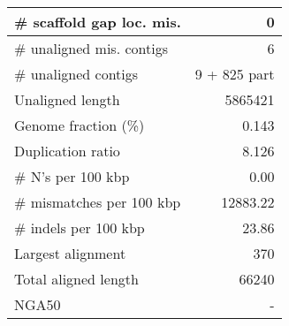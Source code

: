 \documentclass[12pt,a4paper]{article}
\begin{document}
\begin{table}[ht]
\begin{center}
\begin{tabular}{|l*{1}{|r}|}
\# scaffold gap loc. mis. & 0 \\ \hline
\# unaligned mis. contigs & 6 \\ \hline
\# unaligned contigs & 9 + 825 part \\ \hline
Unaligned length & 5865421 \\ \hline
Genome fraction (\%) & 0.143 \\ \hline
Duplication ratio & 8.126 \\ \hline
\# N's per 100 kbp & 0.00 \\ \hline
\# mismatches per 100 kbp & 12883.22 \\ \hline
\# indels per 100 kbp & 23.86 \\ \hline
Largest alignment & 370 \\ \hline
Total aligned length & 66240 \\ \hline
NGA50 & - \\ \hline
\end{tabular}
\end{center}
\end{table}
\end{document}
